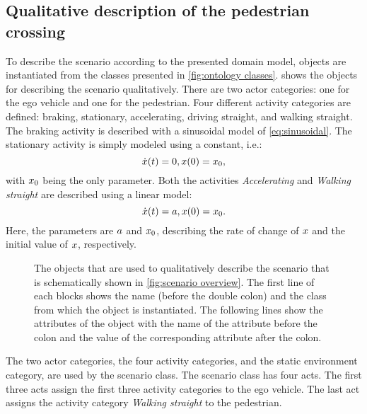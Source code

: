 \subsection{Qualitative description of the pedestrian crossing}
\label{sec:example qualitative}
To describe the scenario according to the presented domain model, objects are instantiated from the classes presented in \cref{fig:ontology classes}.  shows the objects for describing the scenario qualitatively. There are two actor categories: one for the ego vehicle and one for the pedestrian. Four different activity categories are defined: braking, stationary, accelerating, driving straight, and walking straight. The braking activity is described with a sinusoidal model of \cref{eq:sinusoidal}. The stationary activity is simply modeled using a constant, i.e.:
\begin{equation}
	\dot{x}(t) = 0, x(0) = x_0,
\end{equation}
with $x_0$ being the only parameter.
Both the activities \emph{Accelerating} and \emph{Walking straight} are described using a linear model:
\begin{equation}
	\dot{x}(t) = a, x(0) = x_0.
\end{equation}
Here, the parameters are $a$ and $x_0$, describing the rate of change of $x$ and the initial value of $x$, respectively.
\cbend

\begin{figure}
	\centering
	
	\caption{The objects that are used to qualitatively describe the scenario that is schematically shown in \cref{fig:scenario overview}. The first line of each blocks shows the name (before the double colon) and the class from which the object is instantiated. The following lines show the attributes of the object with the name of the attribute before the colon and the value of the corresponding attribute after the colon.}
	\label{fig:example qualitative}
\end{figure}

\cbstart
The two actor categories, the four activity categories, and the static environment category, are used by the scenario class. The scenario class has four acts. The first three acts assign the first three activity categories to the ego vehicle. The last act assigns the activity category \emph{Walking straight} to the pedestrian.

